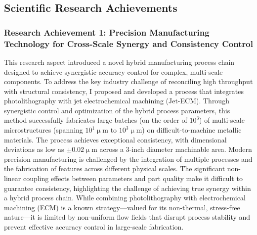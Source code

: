 \documentclass{ResearchStatement}
\begin{document}
\clearpage
\noindent\makebox[\textwidth][c]{%
    \centering
    
}
\begingroup
{}
\label{fig:contribution}
\endgroup

\subsection{Scientific Research Achievements}
\subsubsection{Research Achievement 1: Precision Manufacturing Technology for Cross-Scale Synergy and Consistency Control}
This research aspect introduced a novel hybrid manufacturing process chain designed to achieve synergistic accuracy control for complex, multi-scale components. To address the key industry challenge of reconciling high throughput with structural consistency, I proposed and developed a process that integrates photolithography with jet electrochemical machining (Jet-ECM). Through synergistic control and optimization of the hybrid process parameters, this method successfully fabricates large batches (on the order of $10^3$) of multi-scale microstructures (spanning $10^1 \upmu$m to $10^3 \upmu$m) on difficult-to-machine metallic materials. The process achieves exceptional consistency, with dimensional deviations as low as $\pm 0.02\upmu$m across a 3-inch diameter machinable area.
Modern precision manufacturing is challenged by the integration of multiple processes and the fabrication of features across different physical scales. The significant non-linear coupling effects between parameters and part quality make it difficult to guarantee consistency, highlighting the challenge of achieving true synergy within a hybrid process chain. While combining photolithography with electrochemical machining (ECM) is a known strategy—valued for its non-thermal, stress-free nature—it is limited by non-uniform flow fields that disrupt process stability and prevent effective accuracy control in large-scale fabrication.
\end{document}
